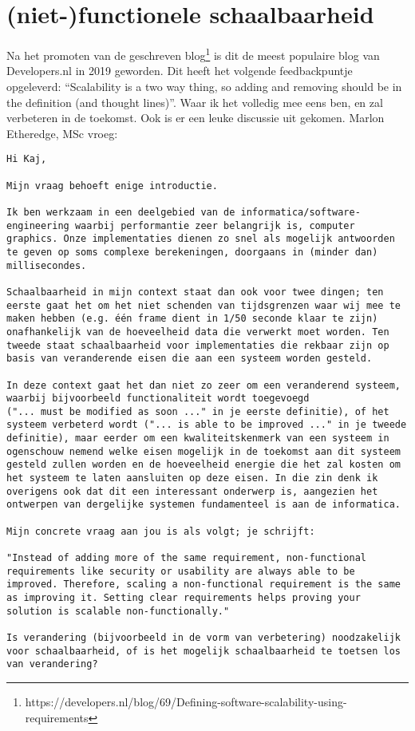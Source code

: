 \section{(niet-)functionele schaalbaarheid}

\label{feedbackschaalbaarheid}

Na het promoten van de geschreven blog\footnote{https://developers.nl/blog/69/Defining-software-scalability-using-requirements} is dit de meest populaire blog van Developers.nl in 2019 geworden. Dit heeft het volgende feedbackpuntje opgeleverd: \enquote{Scalability is a two way thing, so adding and removing should be in the definition (and thought lines)}. Waar ik het volledig mee eens ben, en zal verbeteren in de toekomst. Ook is er een leuke discussie uit gekomen. Marlon Etheredge, MSc vroeg:
\begin{verbatim}
Hi Kaj,

Mijn vraag behoeft enige introductie.

Ik ben werkzaam in een deelgebied van de informatica/software-engineering waarbij performantie zeer belangrijk is, computer graphics. Onze implementaties dienen zo snel als mogelijk antwoorden te geven op soms complexe berekeningen, doorgaans in (minder dan) millisecondes.

Schaalbaarheid in mijn context staat dan ook voor twee dingen; ten eerste gaat het om het niet schenden van tijdsgrenzen waar wij mee te maken hebben (e.g. één frame dient in 1/50 seconde klaar te zijn) onafhankelijk van de hoeveelheid data die verwerkt moet worden. Ten tweede staat schaalbaarheid voor implementaties die rekbaar zijn op basis van veranderende eisen die aan een systeem worden gesteld.

In deze context gaat het dan niet zo zeer om een veranderend systeem, waarbij bijvoorbeeld functionaliteit wordt toegevoegd
("... must be modified as soon ..." in je eerste definitie), of het systeem verbeterd wordt ("... is able to be improved ..." in je tweede definitie), maar eerder om een kwaliteitskenmerk van een systeem in ogenschouw nemend welke eisen mogelijk in de toekomst aan dit systeem gesteld zullen worden en de hoeveelheid energie die het zal kosten om het systeem te laten aansluiten op deze eisen. In die zin denk ik overigens ook dat dit een interessant onderwerp is, aangezien het ontwerpen van dergelijke systemen fundamenteel is aan de informatica.

Mijn concrete vraag aan jou is als volgt; je schrijft:

"Instead of adding more of the same requirement, non-functional requirements like security or usability are always able to be improved. Therefore, scaling a non-functional requirement is the same as improving it. Setting clear requirements helps proving your solution is scalable non-functionally."

Is verandering (bijvoorbeeld in de vorm van verbetering) noodzakelijk voor schaalbaarheid, of is het mogelijk schaalbaarheid te toetsen los van verandering?
\end{verbatim}
